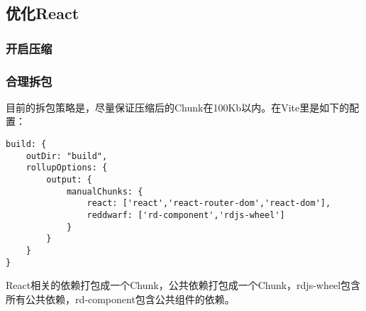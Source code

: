 \documentclass[../../../dolphin-book-2023.tex]{subfiles}
\begin{document}
\subsection{优化React}

\subsubsection{开启压缩}

\subsubsection{合理拆包}

目前的拆包策略是，尽量保证压缩后的Chunk在100Kb以内。在Vite里是如下的配置：

\begin{lstlisting}
build: {
    outDir: "build",
    rollupOptions: {
        output: {
            manualChunks: {
                react: ['react','react-router-dom','react-dom'],
                reddwarf: ['rd-component','rdjs-wheel']
            }
        }
    }
}
\end{lstlisting}

React相关的依赖打包成一个Chunk，公共依赖打包成一个Chunk，rdjs-wheel包含所有公共依赖，rd-component包含公共组件的依赖。
\end{document}
